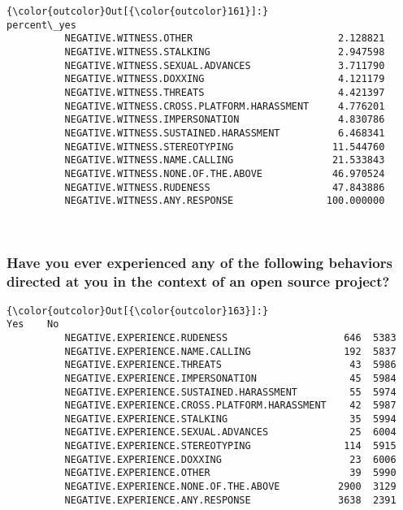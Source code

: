 \documentclass[11pt]{article}
\begin{document}
            \begin{Verbatim}[commandchars=\\\{\}]
{\color{outcolor}Out[{\color{outcolor}161}]:}                                             percent\_yes
          NEGATIVE.WITNESS.OTHER                         2.128821
          NEGATIVE.WITNESS.STALKING                      2.947598
          NEGATIVE.WITNESS.SEXUAL.ADVANCES               3.711790
          NEGATIVE.WITNESS.DOXXING                       4.121179
          NEGATIVE.WITNESS.THREATS                       4.421397
          NEGATIVE.WITNESS.CROSS.PLATFORM.HARASSMENT     4.776201
          NEGATIVE.WITNESS.IMPERSONATION                 4.830786
          NEGATIVE.WITNESS.SUSTAINED.HARASSMENT          6.468341
          NEGATIVE.WITNESS.STEREOTYPING                 11.544760
          NEGATIVE.WITNESS.NAME.CALLING                 21.533843
          NEGATIVE.WITNESS.NONE.OF.THE.ABOVE            46.970524
          NEGATIVE.WITNESS.RUDENESS                     47.843886
          NEGATIVE.WITNESS.ANY.RESPONSE                100.000000
\end{Verbatim}
        

    \begin{center}
    \end{center}
    { \hspace*{\fill} \\}
    
    \subsubsection{Have you ever experienced any of the following behaviors
directed at you in the context of an open source
project?}\label{have-you-ever-experienced-any-of-the-following-behaviors-directed-at-you-in-the-context-of-an-open-source-project}


            \begin{Verbatim}[commandchars=\\\{\}]
{\color{outcolor}Out[{\color{outcolor}163}]:}                                                 Yes    No
          NEGATIVE.EXPERIENCE.RUDENESS                    646  5383
          NEGATIVE.EXPERIENCE.NAME.CALLING                192  5837
          NEGATIVE.EXPERIENCE.THREATS                      43  5986
          NEGATIVE.EXPERIENCE.IMPERSONATION                45  5984
          NEGATIVE.EXPERIENCE.SUSTAINED.HARASSMENT         55  5974
          NEGATIVE.EXPERIENCE.CROSS.PLATFORM.HARASSMENT    42  5987
          NEGATIVE.EXPERIENCE.STALKING                     35  5994
          NEGATIVE.EXPERIENCE.SEXUAL.ADVANCES              25  6004
          NEGATIVE.EXPERIENCE.STEREOTYPING                114  5915
          NEGATIVE.EXPERIENCE.DOXXING                      23  6006
          NEGATIVE.EXPERIENCE.OTHER                        39  5990
          NEGATIVE.EXPERIENCE.NONE.OF.THE.ABOVE          2900  3129
          NEGATIVE.EXPERIENCE.ANY.RESPONSE               3638  2391
\end{Verbatim}
        
\end{document}
